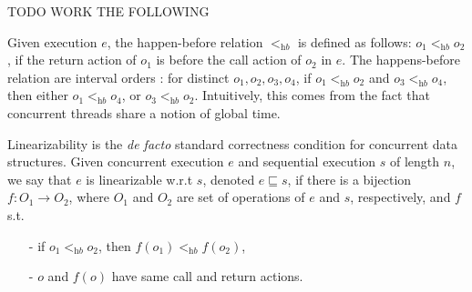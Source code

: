%

TODO WORK THE FOLLOWING

Given execution $e$, the happen-before relation $<_{\textit{hb}}$ is defined as follows: $o_1 <_{\textit{hb}} o_2$, if the return action of $o_1$ is before the call action of $o_2$ in $e$. The happens-before relation are interval orders \cite{DBLP:conf/popl/BouajjaniEEH15}: for distinct $o_1,o_2,o_3,o_4$, if $o_1 <_{\textit{hb}} o_2$ and $o_3 <_{\textit{hb}} o_4$, then either $o_1 <_{\textit{hb}} o_4$, or $o_3 <_{\textit{hb}} o_2$. Intuitively, this comes from the fact that concurrent threads share a notion of global time.

Linearizability \cite{journals/toplas/HerlihyW90} is the \emph{de facto} standard correctness condition for concurrent data structures. Given concurrent execution $e$ and sequential execution $s$ of length $n$, we say that $e$ is linearizable w.r.t $s$, denoted $e \sqsubseteq s$, if there is a bijection $f: O_1 \rightarrow O_2$, where $O_1$ and $O_2$ are set of operations of $e$ and $s$, respectively, and $f$ s.t.

\begin{itemize}
\item[-] if $o_1 <_{\textit{hb}} o_2$, then $f(o_1) <_{\textit{hb}} f(o_2)$,

\item[-] $o$ and $f(o)$ have same call and return actions.
\end{itemize}

